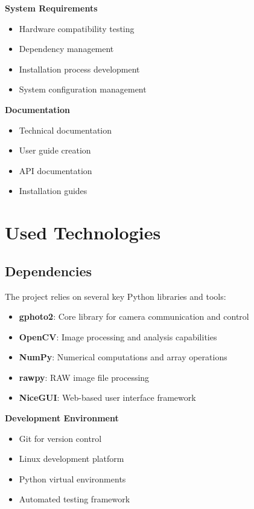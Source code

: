 \textbf{System Requirements}
\begin{itemize}
    \item Hardware compatibility testing
    \item Dependency management
    \item Installation process development
    \item System configuration management
\end{itemize}

\textbf{Documentation}
\begin{itemize}
    \item Technical documentation
    \item User guide creation
    \item API documentation
    \item Installation guides
\end{itemize}

\section{Used Technologies} %

\subsection{Dependencies}
The project relies on several key Python libraries and tools:

\begin{itemize}
    \item \textbf{gphoto2}: Core library for camera communication and control
    \item \textbf{OpenCV}: Image processing and analysis capabilities
    \item \textbf{NumPy}: Numerical computations and array operations
    \item \textbf{rawpy}: RAW image file processing
    \item \textbf{NiceGUI}: Web-based user interface framework
\end{itemize}



\textbf{Development Environment}
\begin{itemize}
    \item Git for version control
    \item Linux development platform
    \item Python virtual environments
    \item Automated testing framework
\end{itemize}

